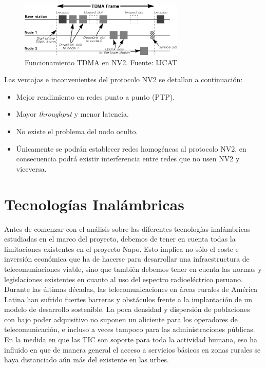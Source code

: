 		\begin{figure}[H]
			\centering
			\includegraphics[width=0.7\textwidth]{img/TDMA.png}
			\caption{Funcionamiento TDMA en NV2. Fuente: IJCAT}
			\label{NV2}
		\end{figure}
		
		Las ventajas e inconvenientes del protocolo NV2 se detallan a continuación:
		\begin{itemize}
			\item Mejor rendimiento en redes punto a punto (PTP).
			\item Mayor \textit{throughput} y menor latencia.
			\item No existe el problema del nodo oculto.
			\item Únicamente se podrán establecer redes homogéneas al protocolo NV2, en consecuencia podrá existir interferencia entre redes que no usen NV2 y viceversa.
		\end{itemize}
		
\section{Tecnologías Inalámbricas}
Antes de comenzar con el análisis sobre las diferentes tecnologías inalámbricas estudiadas en el marco del proyecto,  debemos de tener en cuenta todas la limitaciones existentes en el proyecto Napo. Esto implica no sólo el coste e inversión económica que ha de hacerse para desarrollar una infraestructura de telecomuniaciones viable, sino que también debemos tener en cuenta las normas y legislaciones existentes en cuanto al uso del espectro radioeléctrico peruano.\\

Durante las últimas décadas, las telecomunicaciones en áreas rurales de América Latina han sufrido fuertes barreras y obstáculos frente a la implantación de un modelo de desarrollo sostenible. La poca densidad y dispersión de poblaciones con bajo poder adquisitivo no suponen un aliciente para los operadores de telecomunicación, e incluso a veces tampoco para las administraciones públicas. En la medida en que las TIC son soporte para toda la actividad humana, eso ha influido en que de manera general el acceso a servicios básicos en zonas rurales se haya distanciado aún más del existente en las urbes.\\

